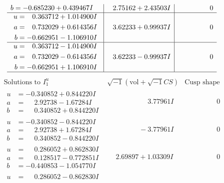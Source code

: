 \documentclass[1p]{elsarticle_modified}
\theoremstyle{definition}
\newcommand{\I}{\sqrt{-1}}
\begin{document}
$$\begin{array}{c|c|c}
\begin{aligned}
b &= -0.685230 + 0.439467 I\end{aligned}
 & \phantom{-}2.75162 + 2.43503 I & \phantom{-0.000000 } 0 \\ \hline\begin{aligned}
u &= \phantom{-}0.363712 + 1.014900 I \\
a &= \phantom{-}0.732029 + 0.614356 I \\
b &= -0.662951 - 1.106910 I\end{aligned}
 & \phantom{-}3.62233 + 0.99937 I & \phantom{-0.000000 } 0 \\ \hline\begin{aligned}
u &= \phantom{-}0.363712 - 1.014900 I \\
a &= \phantom{-}0.732029 - 0.614356 I \\
b &= -0.662951 + 1.106910 I\end{aligned}
 & \phantom{-}3.62233 - 0.99937 I & \phantom{-0.000000 } 0\\
 \hline 
 \end{array}$$\newpage$$\begin{array}{c|c|c}  
\text{Solutions to }I^u_{1}& \I (\text{vol} + \sqrt{-1}CS) & \text{Cusp shape}\\
 \hline 
\begin{aligned}
u &= -0.340852 + 0.844220 I \\
a &= \phantom{-}2.92738 - 1.67284 I \\
b &= \phantom{-}0.340852 + 0.844220 I\end{aligned}
 & \phantom{-0.000000 -}3.77961 I & \phantom{-0.000000 } 0 \\ \hline\begin{aligned}
u &= -0.340852 - 0.844220 I \\
a &= \phantom{-}2.92738 + 1.67284 I \\
b &= \phantom{-}0.340852 - 0.844220 I\end{aligned}
 & \phantom{-0.000000 } -3.77961 I & \phantom{-0.000000 } 0 \\ \hline\begin{aligned}
u &= \phantom{-}0.286052 + 0.862830 I \\
a &= \phantom{-}0.128517 - 0.772851 I \\
b &= -0.440853 - 1.054770 I\end{aligned}
 & \phantom{-}2.69897 + 1.03309 I & \phantom{-0.000000 } 0 \\ \hline\begin{aligned}
u &= \phantom{-}0.286052 - 0.862830 I \\

\end{aligned}
\end{array}$$
\end{document}
